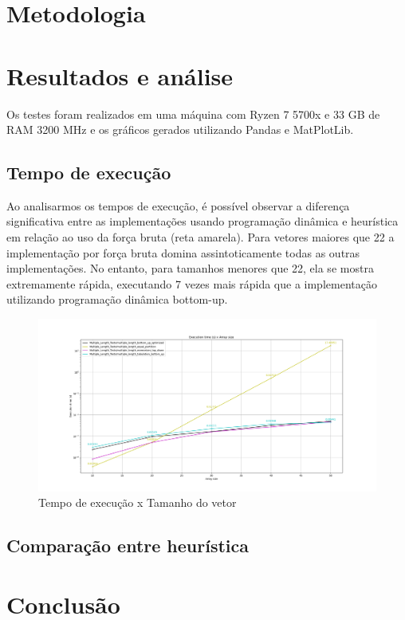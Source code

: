 \documentclass{article}
\begin{document}
\section{Metodologia}

\section{Resultados e análise}
Os testes foram realizados em uma máquina com Ryzen 7 5700x e 33 GB de RAM 3200 MHz e os gráficos gerados utilizando Pandas e MatPlotLib.

\subsection{Tempo de execução}

Ao analisarmos os tempos de execução, é possível observar a diferença significativa entre as implementações usando programação dinâmica e heurística em relação ao uso da força bruta (reta amarela). Para vetores maiores que 22 a implementação por força bruta domina assintoticamente todas as outras implementações. No entanto, para tamanhos menores que 22, ela se mostra extremamente rápida, executando 7 vezes mais rápida que a implementação utilizando programação dinâmica bottom-up.

\begin{figure} [H]
    \centering
    \caption{Tempo de execução x Tamanho do vetor}
    \includegraphics[width=1\textwidth]{images/multiple_length_tabulation_bottom_up}
\end{figure}

\subsection{Comparação entre heurística}


\section{Conclusão}
\end{document}
